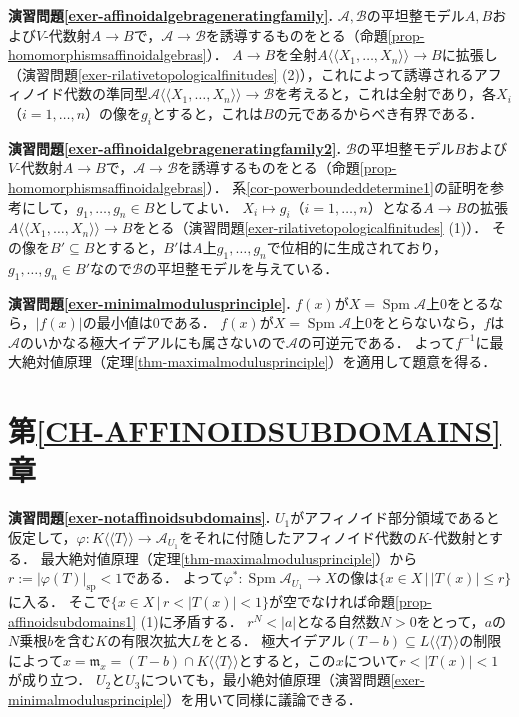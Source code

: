 \documentclass[a4paper,12pt, dvipdfmx]{jsbook}
\def\m{\mathfrak{m}}
\def\sp{\mathop{\mathrm{sp}}\nolimits}
\def\Spm{\mathop{\mathrm{Spm}}\nolimits}
\def\dl{\langle\!\langle}
\def\dr{\rangle\!\rangle}
\newcommand{\abs}[1]{\lvert#1\rvert}
\theoremstyle{plain}
\theoremstyle{definition}
\begin{document}
{\medskip\noindent
{\bf 演習問題\ref{exer-affinoidalgebrageneratingfamily}.}
$\mathcal{A},\mathcal{B}$の平坦整モデル$A,B$および$V$-代数射$A\rightarrow B$で，$\mathcal{A}\rightarrow\mathcal{B}$を誘導するものをとる（命題\ref{prop-homomorphismsaffinoidalgebras}）．
$A\rightarrow B$を全射$A\dl X_1,\ldots,X_n\dr\rightarrow B$に拡張し（演習問題\ref{exer-rilativetopologicalfinitudes} (2)），これによって誘導されるアフィノイド代数の準同型$\mathcal{A}\dl X_1,\ldots,X_n\dr\rightarrow\mathcal{B}$を考えると，これは全射であり，各$X_i$（$i=1,\ldots,n$）の像を$g_i$とすると，これは$B$の元であるからべき有界である．

\medskip\noindent
{\bf 演習問題\ref{exer-affinoidalgebrageneratingfamily2}.}
$\mathcal{B}$の平坦整モデル$B$および$V$-代数射$A\rightarrow B$で，$\mathcal{A}\rightarrow\mathcal{B}$を誘導するものをとる（命題\ref{prop-homomorphismsaffinoidalgebras}）．
系\ref{cor-powerboundeddetermine1}の証明を参考にして，$g_1,\ldots,g_n\in B$としてよい．
$X_i\mapsto g_i$（$i=1,\ldots,n$）となる$A\rightarrow B$の拡張$A\dl X_1,\ldots,X_n\dr\rightarrow B$をとる（演習問題\ref{exer-rilativetopologicalfinitudes} (1)）．
その像を$B'\subseteq B$とすると，$B'$は$A$上$g_1,\ldots,g_n$で位相的に生成されており，$g_1,\ldots,g_n\in B'$なので$\mathcal{B}$の平坦整モデルを与えている．

\medskip\noindent
{\bf 演習問題\ref{exer-minimalmodulusprinciple}.}
$f(x)$が$X=\Spm\mathcal{A}$上$0$をとるなら，$\abs{f(x)}$の最小値は$0$である．
$f(x)$が$X=\Spm\mathcal{A}$上$0$をとらないなら，$f$は$\mathcal{A}$のいかなる極大イデアルにも属さないので$\mathcal{A}$の可逆元である．
よって$f^{-1}$に最大絶対値原理（定理\ref{thm-maximalmodulusprinciple}）を適用して題意を得る．





\section*{第\ref{CH-AFFINOIDSUBDOMAINS}章}

\noindent
{\bf 演習問題\ref{exer-notaffinoidsubdomains}.}
$U_1$がアフィノイド部分領域であると仮定して，$\varphi\colon K\dl T\dr\rightarrow\mathcal{A}_{U_1}$をそれに付随したアフィノイド代数の$K$-代数射とする．
最大絶対値原理（定理\ref{thm-maximalmodulusprinciple}）から$r:=\abs{\varphi(T)}_{\sp}<1$である．
よって$\varphi^{\ast}\colon\Spm\mathcal{A}_{U_1}\rightarrow X$の像は$\{x\in X\,|\,\abs{T(x)}\leq r\}$に入る．
そこで$\{x\in X\,|\,r<\abs{T(x)}<1\}$が空でなければ命題\ref{prop-affinoidsubdomains1} (1)に矛盾する．
$r^N<\abs{a}$となる自然数$N>0$をとって，$a$の$N$乗根$b$を含む$K$の有限次拡大$L$をとる．
極大イデアル$(T-b)\subseteq L\dl T\dr$の制限によって$x=\m_x=(T-b)\cap K\dl T\dr$とすると，この$x$について$r<\abs{T(x)}<1$が成り立つ．
$U_2$と$U_3$についても，最小絶対値原理（演習問題\ref{exer-minimalmodulusprinciple}）を用いて同様に議論できる．

}
\end{document}
